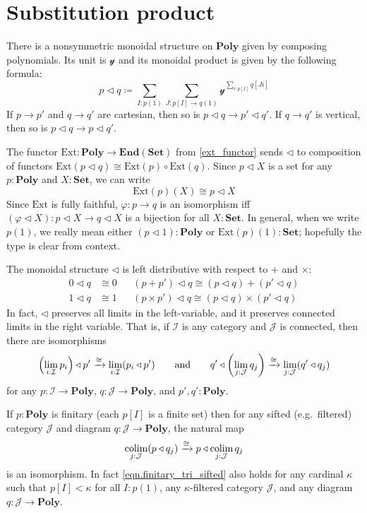 \documentclass[11pt, one side, article]{memoir}
\theoremstyle{definition}
\theoremstyle{plain}
\DeclareMathOperator*{\colim}{colim}
\newcommand{\cat}[1]{\mathcal{#1}}%
\newcommand{\Cat}[1]{\mathbf{#1}}%
\newcommand{\fun}[1]{\mathrm{#1}}%
\newcommand{\To}[2][]{\xrightarrow[#1]{\tn{$#2$}}}
\newcommand{\tn}[1]{\textnormal{#1}}
\newcommand{\smset}{\Cat{Set}}
\newcommand{\End}{\Cat{End}}
\newcommand{\yon}{{\mathcal{y}}}
\newcommand{\poly}{\Cat{Poly}}
\newcommand{\0}{\textsf{0}}
\newcommand{\1}{\tn{\textsf{1}}}
\newcommand{\tri}{\mathbin{\triangleleft}}
\newcommand{\hh}[2][]{#1 \tn{#2} #1}
\newcommand{\qqand}{\hh[\qquad]{and}}
\newcommand{\ext}{\fun{Ext}}
\begin{document}
\chapter{Substitution product}

There is a nonsymmetric monoidal structure on $\poly$ given by composing polynomials. Its unit is $\yon$ and its monoidal product is given by the following formula:
\begin{equation}
p\tri q\coloneqq\sum_{I: p(1)}\sum_{J\colon p[I]\to q(1)}\yon^{\sum\limits_{i: p[I]}q[Ji]}
\end{equation}
If $p\to p'$ and $q\to q'$ are cartesian, then so is $p\tri q\to p'\tri q'$. If $q\to q'$ is vertical, then so is $p\tri q\to p\tri q'$. 

The functor $\ext\colon\poly\to\End(\smset)$ from \eqref{ext_functor} sends $\tri$ to composition of functors $\ext(p\tri q)\cong\ext(p)\circ\ext(q)$. Since $p\tri X$ is a set for any $p:\poly$ and $X:\smset$, we can write
\begin{equation}
\ext(p)(X)\cong p\tri X
\end{equation}
Since $\ext$ is fully faithful, $\varphi\colon p\to q$ is an isomorphism iff $(\varphi\tri X)\colon p\tri X\to q\tri X$ is a bijection for all $X:\smset$. In general, when we write $p(1)$, we really mean either $(p\tri 1):\poly$ or $\ext(p)(1):\smset$; hopefully the type is clear from context.

The monoidal structure $\tri$ is left distributive with respect to $+$ and $\times$:
\begin{align}
	0\tri q&\cong 0&&(p+p')\tri q\cong (p\tri q)+(p'\tri q)\label{eqn.comp_plus}\\
	1\tri q&\cong 1&&(p\times p')\tri q\cong (p\tri q)\times(p'\tri q)\label{eqn.comp_times}
\end{align}
In fact, $\tri$ preserves all limits in the left-variable, and it preserves connected limits in the right variable. That is, if $\cat{I}$ is any category and $\cat{J}$ is connected, then there are isomorphisms
\begin{equation}
\left(\lim_{i:\cat{I}}p_i\right)\tri p'\To{\cong}\lim_{i:\cat{I}}(p_i\tri p')
\qqand
q'\tri\left(\lim_{j:\cat{J}}q_j\right)\To{\cong}\lim_{j:\cat{J}}(q'\tri q_j)
\end{equation}
for any $p\colon\cat{I}\to\poly$, $q\colon\cat{J}\to\poly$, and $p',q':\poly$.

If $p:\poly$ is finitary (each $p[I]$ is a finite set) then for any sifted (e.g.\ filtered) category $\cat{J}$ and diagram $q\colon \cat{J}\to\poly$, the natural map
\begin{equation}\label{eqn.finitary_tri_sifted}
  \colim_{j: \cat{J}}(p\tri q_j)
  \To{\cong}
	p\tri\colim_{j: \cat{J}}q_j
\end{equation}
is an isomorphism. In fact \cref{eqn.finitary_tri_sifted} also holds for any cardinal $\kappa$ such that $p[I]<\kappa$ for all $I:p(1)$, any $\kappa$-filtered category $\cat{J}$, and any diagram $q\colon \cat{J}\to\poly$.
\end{document}
